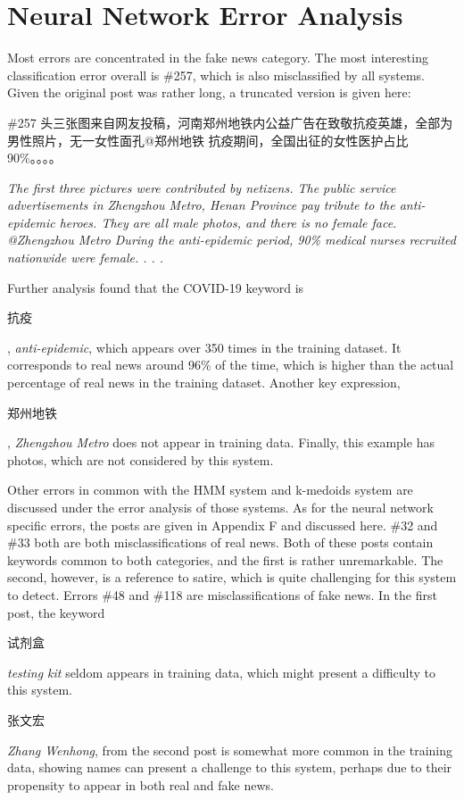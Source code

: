 \documentclass [11pt, proquest] {uwthesis}[2020/02/24]
\begin{document}
\section{Neural Network Error Analysis}
Most errors are concentrated in the fake news category. The most interesting classification error overall is \#257, which is also misclassified by all systems. Given the original post was rather long, a truncated version is given here:

\begin{CJK*}{UTF8}{gbsn}\#257 头三张图来自网友投稿，河南郑州地铁内公益广告在致敬抗疫英雄，全部为男性照片，无一女性面孔@郑州地铁 抗疫期间，全国出征的女性医护占比90\%。。。。\end{CJK*}

\textit{The first three pictures were contributed by netizens. The public service advertisements in Zhengzhou Metro, Henan Province pay tribute to the anti-epidemic heroes. They are all male photos, and there is no female face. @Zhengzhou Metro During the anti-epidemic period, 90\% medical nurses recruited nationwide were female. . . .}

Further analysis found that the COVID-19 keyword is \begin{CJK*}{UTF8}{gbsn}抗疫\end{CJK*}, \textit{anti-epidemic}, which appears over 350 times in the training dataset. It corresponds to real news around 96\% of the time, which is higher than the actual percentage of real news in the training dataset. Another key expression, \begin{CJK*}{UTF8}{gbsn}郑州地铁\end{CJK*}, \textit{Zhengzhou Metro} does not appear in training data. Finally, this example has photos, which are not considered by this system.

Other errors in common with the HMM system and k-medoids system are discussed under the error analysis of those systems. As for the neural network specific errors, the posts are given in Appendix F and discussed here. \#32 and \#33 both are both misclassifications of real news. Both of these posts contain keywords common to both categories, and the first is rather unremarkable. The second, however, is a reference to satire, which is quite challenging for this system to detect.
Errors \#48 and \#118 are misclassifications of fake news. In the first post, the keyword \begin{CJK*}{UTF8}{gbsn}试剂盒\end{CJK*} \textit{testing kit} seldom appears in training data, which might present a difficulty to this system. \begin{CJK*}{UTF8}{gbsn}张文宏\end{CJK*} \textit{Zhang Wenhong}, from the second post is somewhat more common in the training data, showing names can present a challenge to this system, perhaps due to their propensity to appear in both real and fake news.
\end{document}
